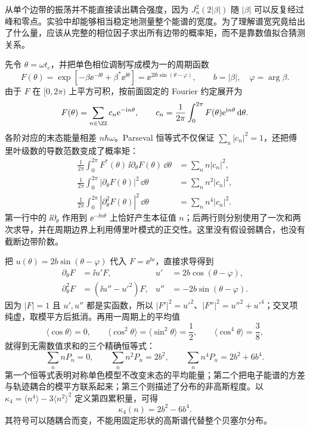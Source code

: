 从单个边带的振荡并不能直接读出耦合强度，因为 $J_n^2(2|\beta|)$ 随 $|\beta|$ 可以反复经过峰和零点。实验中却能够相当稳定地测量整个能谱的宽度。为了理解谱宽究竟给出了什么量，应该从完整的相位因子求出所有边带的概率矩，而不是靠数值拟合猜测关系。

先令 $\theta=\omega t_c$，并把单色相位调制写成模为一的周期函数
\begin{equation}
F(\theta)=\exp\!\left[-\beta\ee^{-\ii\theta}+\beta^*\ee^{\ii\theta}\right]
=\ee^{2\ii b\sin(\theta-\varphi)},\qquad
b=|\beta|,\quad\varphi=\arg\beta .
\label{eq:phase-modulation-moment-generator}
\end{equation}
由于 $F$ 在 $[0,2\pi)$ 上平方可积，按前面固定的 Fourier 约定展开为
\[
F(\theta)=\sum_{n\in\ZZ}c_n\ee^{-\ii n\theta},
\qquad c_n=\frac{1}{2\pi}\int_0^{2\pi}F(\theta)\ee^{\ii n\theta}\,\dd\theta .
\]
各阶对应的末态能量相差 $n\hbar\omega$。Parseval 恒等式不仅保证 $\sum_n|c_n|^2=1$，还把傅里叶级数的导数范数变成了概率矩：
\begin{align*}
\frac{1}{2\pi}\int_0^{2\pi}\!F^*(\theta)\,\ii\partial_\theta F(\theta)\,\dd\theta
&=\sum_n n|c_n|^2,\\
\frac{1}{2\pi}\int_0^{2\pi}\!|\partial_\theta F(\theta)|^2\,\dd\theta
&=\sum_n n^2|c_n|^2,\\
\frac{1}{2\pi}\int_0^{2\pi}\!|\partial_\theta^2 F(\theta)|^2\,\dd\theta
&=\sum_n n^4|c_n|^2.
\end{align*}
第一行中的 $\ii\partial_\theta$ 作用到 $\ee^{-\ii n\theta}$ 上恰好产生本征值 $n$；后两行则分别使用了一次和两次求导，并在周期边界上利用傅里叶模式的正交性。这里没有假设弱耦合，也没有截断边带阶数。

把 $u(\theta)=2b\sin(\theta-\varphi)$ 代入 $F=\ee^{\ii u}$，直接求导得到
\begin{align*}
\partial_\theta F&=\ii u'F,
&u'&=2b\cos(\theta-\varphi),\\
\partial_\theta^2F&=(\ii u''-u'^2)F,
&u''&=-2b\sin(\theta-\varphi).
\end{align*}
因为 $|F|=1$ 且 $u',u''$ 都是实函数，所以 $|F'|^2=u'^2$、$|F''|^2=u''^2+u'^4$；交叉项纯虚，取模平方后抵消。再用一周期上的平均值
\[
\langle\cos\theta\rangle=0,\qquad
\langle\cos^2\theta\rangle=\langle\sin^2\theta\rangle=\frac12,
\qquad \langle\cos^4\theta\rangle=\frac38,
\]
就得到无需数值求和的三个精确恒等式：
\begin{equation}
\sum_n nP_n=0,\qquad
\sum_n n^2P_n=2b^2,\qquad
\sum_n n^4P_n=2b^2+6b^4.
\label{eq:pinem-sideband-moment-identities}
\end{equation}
第一个恒等式表明对称单色模型不改变末态的平均能量；第二个把电子能谱的方差与轨迹耦合的模平方联系起来；第三个则描述了分布的非高斯程度。以 $\kappa_4=\langle n^4\rangle-3\langle n^2\rangle^2$ 定义第四累积量，可得
\begin{equation}
\kappa_4(n)=2b^2-6b^4.
\label{eq:pinem-fourth-cumulant}
\end{equation}
其符号可以随耦合而变，不能用固定形状的高斯谱代替整个贝塞尔分布。


